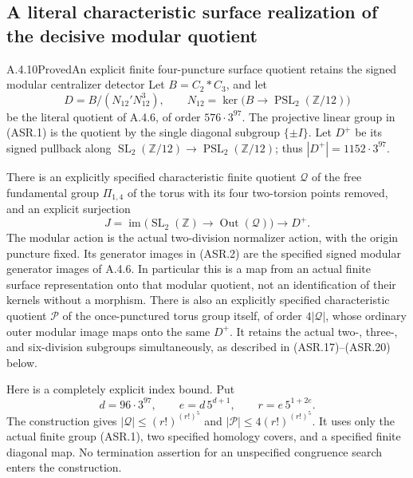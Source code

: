 \subsection{A literal characteristic surface realization of the decisive modular quotient}

\begin{result}{A.4.10}{Proved}{An explicit finite four-puncture surface quotient retains the signed modular centralizer detector}
Let $B=C_2*C_3$, and let
\[
 D=B/(N_{12}'N_{12}^3),\qquad
 N_{12}=\ker\bigl(B\longrightarrow
                 \operatorname{PSL}_2(\mathbb Z/12)\bigr)
                                                        \tag{ASR.1}
\]
be the literal quotient of A.4.6, of order $576\cdot3^{97}$.
The projective linear group in (ASR.1) is the quotient by the
single diagonal subgroup $\{\pm I\}$.
Let $D^+$ be its signed pullback along
$\operatorname{SL}_2(\mathbb Z/12)\to
 \operatorname{PSL}_2(\mathbb Z/12)$; thus
$|D^+|=1152\cdot3^{97}$.

There is an explicitly specified characteristic finite quotient
$\mathcal Q$ of the free fundamental group $\Pi_{1,4}$ of
the torus with its four two-torsion points removed, and an
explicit surjection
\[
 J=\operatorname{im}\bigl(
 \operatorname{SL}_2(\mathbb Z)\longrightarrow
                 \operatorname{Out}(\mathcal Q)\bigr)
 \longrightarrow D^+.                                  \tag{ASR.2}
\]
The modular action is the actual two-division normalizer action,
with the origin puncture fixed.  Its generator images in (ASR.2)
are the specified signed modular generator images of A.4.6.
In particular this is a map from an actual finite surface
representation onto that modular quotient, not an identification
of their kernels without a morphism.
There is also an explicitly specified characteristic quotient
$\mathcal P$ of the once-punctured torus group itself, of order
$4|\mathcal Q|$, whose ordinary outer modular image maps onto
the same $D^+$.  It retains the actual two-, three-, and
six-division subgroups simultaneously, as described in
(ASR.17)--(ASR.20) below.

Here is a completely explicit index bound.  Put
\[
 d=96\cdot3^{97},\qquad
 e=d\,5^{d+1},\qquad
 r=e\,5^{1+2e}.
                                                        \tag{ASR.3}
\]
The construction gives
$|\mathcal Q|\leq(r!)^{(r!)^5}$ and
$|\mathcal P|\leq4(r!)^{(r!)^5}$.
It uses only the actual finite group (ASR.1), two specified
homology covers, and a specified finite diagonal map.
No termination assertion for an unspecified congruence search
enters the construction.
\end{result}

